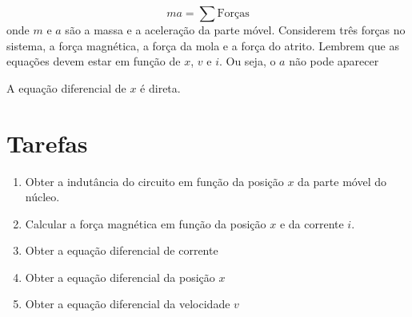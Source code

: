 \documentclass[a4paper]{article}
\theoremstyle{definition}
\theoremstyle{plain}
\begin{document}
\begin{equation}
m a = \displaystyle \sum \text{Forças}
\end{equation}
%
onde $m$ e $a$ são a massa e a aceleração da parte móvel. Considerem três forças no sistema, a força magnética, a força da mola e a força do atrito. Lembrem que as equações devem estar em função de $x$, $v$ e $i$. Ou seja, o $a$ não pode aparecer


A equação diferencial de $x$ é direta. 



\section{Tarefas}


\begin{enumerate}
	\item Obter a indutância do circuito em função da posição $x$ da parte móvel do núcleo.
	\item Calcular a força magnética em função da posição $x$ e da corrente $i$.
	\item Obter a equação diferencial de corrente
	\item Obter a equação diferencial da posição $x$
	\item Obter a equação diferencial da velocidade $v$
\end{enumerate}
\end{document}
